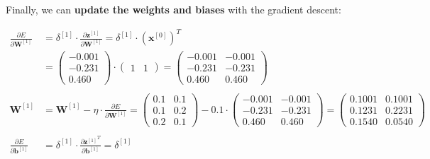 \documentclass[12pt]{article}
\begin{document}
\begin{enumerate}
\vspace{10pt}
Finally, we can \textbf{update the weights and biases} with the gradient descent:

\begin{equation*}
    \begin{aligned}
        \frac{\partial E}{\partial \mathbf{W}^{[1]}} &= \delta^{[1]} \cdot \frac{\partial \mathbf{z}^{[1]}}{\partial \mathbf{W}^{[1]}} = \delta^{[1]} \cdot \left(\mathbf{x}^{[0]}\right)^T \\
        &= \begin{pmatrix}
            -0.001\\
            -0.231\\
            0.460
        \end{pmatrix} \cdot \begin{pmatrix}
            1 & 1 
        \end{pmatrix} = \begin{pmatrix}
            -0.001 & -0.001\\
            -0.231 & -0.231\\
            0.460 & 0.460
        \end{pmatrix}\\
        \\
        \mathbf{W}^{[1]} &= \mathbf{W}^{[1]} - \eta \cdot \frac{\partial E}{\partial \mathbf{W}^{[1]}} = \begin{pmatrix}
            0.1 & 0.1\\
            0.1 & 0.2\\
            0.2 & 0.1
        \end{pmatrix} - 0.1 \cdot \begin{pmatrix}
            -0.001 & -0.001\\
            -0.231 & -0.231\\
            0.460 & 0.460
        \end{pmatrix} = \begin{pmatrix}
            0.1001 & 0.1001\\
            0.1231 & 0.2231\\
            0.1540 & 0.0540
        \end{pmatrix}\\
        \\
        \frac{\partial E}{\partial \mathbf{b}^{[1]}}&= \delta^{[1]} \cdot \frac{{\partial \mathbf{z}^{[1]}}^T}{\partial \mathbf{b}^{[1]}} = \delta^{[1]}\\
        \\

\end{aligned}
\end{equation*}
\end{enumerate}
\end{document}
